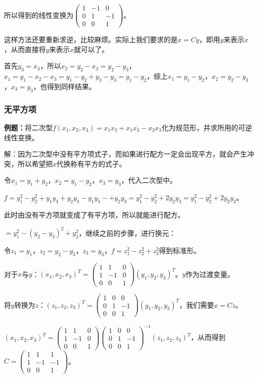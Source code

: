 \documentclass[UTF8, 12pt]{ctexart}
\begin{document}
所以得到的线性变换为$\left(\begin{array}{ccc}
    1 & -1 & 0 \\
    0 & 1 & -1 \\
    0 & 0 & 1
\end{array}\right)$。

这样方法还要重新求逆，比较麻烦。实际上我们要求的是$x=Cy$，即用$y$来表示$x$，从而直接将$y$来表示$x$就可以了。

首先$y_3=x_3$，所以$x_2=y_2-x_3=y_2-y_3$，$x_1=y_1-x_2-x_3=y_1-y_2+y_3-y_3=y_1-y_2$，综上$x_1=y_1-y_2$，$x_2=y_2-y_3$，$x_3=y_3$，也得到同样结果。

\subsubsection{无平方项}

\textbf{例题：}将二次型$f(x_1,x_2,x_3)=x_1x_2+x_1x_3-x_2x_3$化为规范形，并求所用的可逆线性变换。

解：因为二次型中没有平方项式子，而如果进行配方一定会出现平方，就会产生冲突，所以希望把$x$代换称有平方的式子。

令$x_1=y_1+y_2$，$x_2=y_1-y_2$，$x_3=y_3$，代入二次型中。

$f=y_1^2-y_2^2+y_1y_3+y_2y_3-y_1y_3-+y_2y_3=y_1^2-y_2^2+2y_2y_3=y_1^2-y_2^2+2y_2y_3$。

此时由没有平方项就变成了有平方项，所以就能进行配方。

$=y_1^2-(y_2-y_3)^2+y_3^2$，继续之前的步骤，进行换元：

令$z_1=y_1$，$z_2=y_2-y_3$，$z_3=y_3$，$f=z_1^2-z_2^2+z_3^2$得到标准形。

对于$x$与$y$：$(x_1,x_2,x_3)^T=\left(\begin{array}{ccc}
    1 & 1 & 0 \\
    1 & -1 & 0 \\
    0 & 0 & 1
\end{array}\right)(y_1,y_2,y_3)^T$。$y$作为过渡变量。

将$y$转换为$z$：$(z_1,z_2,z_3)^T=\left(\begin{array}{ccc}
    1 & 0 & 0 \\
    0 & 1 & -1 \\
    0 & 0 & 1
\end{array}\right)(y_1,y_2,y_3)^T$，我们需要$x=Cz$。

$(x_1,x_2,x_3)^T=\left(\begin{array}{ccc}
    1 & 1 & 0 \\
    1 & -1 & 0 \\
    0 & 0 & 1
\end{array}\right)\left(\begin{array}{ccc}
    1 & 0 & 0 \\
    0 & 1 & -1 \\
    0 & 0 & 1
\end{array}\right)^{-1}(z_1,z_2,z_3)^T$，从而得到$C=\left(\begin{array}{ccc}
    1 & 1 & 1 \\
    1 & -1 & -1 \\
    0 & 0 & 1
\end{array}\right)$。
\end{document}
